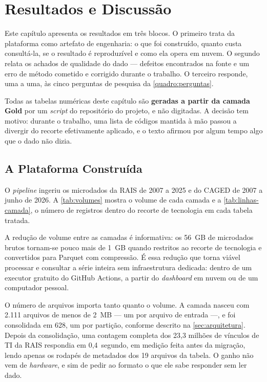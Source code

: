 
\chapter{Resultados e Discussão}
\label{cap:resultados}

Este capítulo apresenta os resultados em três blocos. O primeiro trata da plataforma como artefato de engenharia: o que foi construído, quanto custa consultá-la, se o resultado é reproduzível e como ela opera em nuvem. O segundo relata os achados de qualidade do dado --- defeitos encontrados na fonte e um erro de método cometido e corrigido durante o trabalho. O terceiro responde, uma a uma, às cinco perguntas de pesquisa da \autoref{quadro:perguntas}.

Todas as tabelas numéricas deste capítulo são \textbf{geradas a partir da camada Gold} por um \textit{script} do repositório do projeto, e não digitadas. A decisão tem motivo: durante o trabalho, uma lista de códigos mantida à mão passou a divergir do recorte efetivamente aplicado, e o texto afirmou por algum tempo algo que o dado não dizia.

\section{A Plataforma Construída}

O \textit{pipeline} ingeriu os microdados da RAIS de 2007 a 2025 e do CAGED de 2007 a junho de 2026. A \autoref{tab:volumes} mostra o volume de cada camada e a \autoref{tab:linhas-camada}, o número de registros dentro do recorte de tecnologia em cada tabela tratada.





A redução de volume entre as camadas é informativa: os 56~GB de microdados brutos tornam-se pouco mais de 1~GB quando restritos ao recorte de tecnologia e convertidos para Parquet com compressão. É essa redução que torna viável processar e consultar a série inteira sem infraestrutura dedicada: dentro de um executor gratuito do GitHub Actions, a partir do \textit{dashboard} em nuvem ou de um computador pessoal.

O número de arquivos importa tanto quanto o volume. A camada nasceu com 2.111 arquivos de menos de 2~MB --- um por arquivo de entrada ---, e foi consolidada em 628, um por partição, conforme descrito na \autoref{sec:arquitetura}. Depois da consolidação, uma contagem completa dos 23,3 milhões de vínculos de TI da RAIS respondia em 0,4~segundo, em medição feita antes da migração, lendo apenas os rodapés de metadados dos 19 arquivos da tabela. O ganho não vem de \textit{hardware}, e sim de pedir ao formato o que ele sabe responder sem ler dado.

